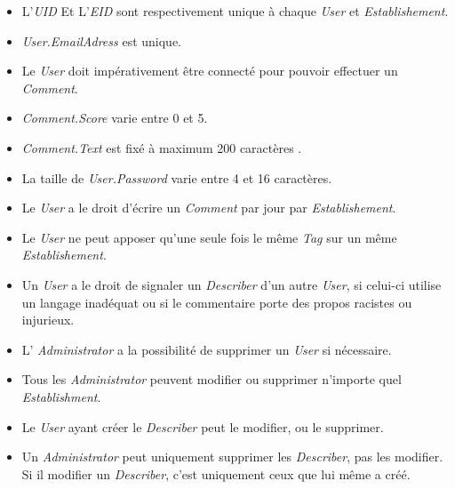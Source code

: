\documentclass{article}
\begin{document}
\begin{itemize}
    \item L'\textit{UID} Et L'\textit{EID}  sont respectivement  unique à chaque \textsl{User} et \textsl{Establishement}.
    
    \item \textit{User.EmailAdress} est unique.
    
    \item Le \textsl{User} doit impérativement être connecté pour pouvoir effectuer un \textsl{Comment}.
    
    \item \textsl{Comment.Score} varie entre 0 et 5.
    
    \item \textsl{Comment.Text} est fixé à maximum 200 caractères .
    
    \item La taille de \textit{User.Password} varie entre 4 et 16 caractères.
    
    \item Le \textsl{User} a le droit d'écrire un \textsl{Comment} par jour par \textsl{Establishement}.
    
    \item Le \textsl{User} ne peut apposer qu'une seule fois le même \textsl{Tag} sur un même \textsl{Establishement}.
    
    \item Un \textsl{User} a le droit de signaler un \textsl{Describer} d'un autre \textsl{User}, si celui-ci utilise un langage inadéquat ou si le commentaire porte des propos racistes ou injurieux.

    \item L' \textsl{Administrator} a la possibilité de supprimer un \textsl{User} si nécessaire.

    \item Tous les \textsl{Administrator} peuvent modifier ou supprimer n'importe quel \textsl{Establishment}.
    
    \item Le \textsl{User} ayant créer le \textsl{Describer} peut le modifier, ou le supprimer.
    
    \item Un \textsl{Administrator} peut uniquement supprimer les \textsl{Describer}, pas les modifier. Si il modifier un \textsl{Describer}, c'est uniquement ceux que lui même a créé.

\end{itemize}
\end{document}
